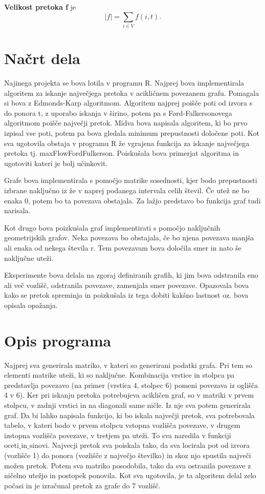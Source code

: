 \documentclass[a4paper]{article}
\begin{document}
\textbf{Velikost pretoka f} je $$|f|= \sum_{i \in V} f(i,t). $$


\section{Načrt dela}

Najinega projekta se bova lotila v programu R. Najprej bova implementirala algoritem za iskanje največjega pretoka v acikličnem povezanem grafu. Pomagala si  bova z Edmonds-Karp algoritmom. Algoritem najprej poišče poti od izvora s do ponora t, z uporabo iskanja v širino, potem pa s  Ford-Falkersonovega algoritmom poišče največji pretok. Midva bova napisala algoritem, ki bo prvo izpisal vse poti, potem pa bova gledala minimum prepustnosti določene poti. Kot sva ugotovila obstaja v programu R že vgrajena funkcija za iskanje največjega pretoka tj. maxFlowFordFulkerson. Poiskušala bova primerjat algoritma in ugotoviti kateri je bolj učinkovit. 

Grafe bova implementirala s pomočjo matrike sosednosti, kjer bodo prepustnosti izbrane naključno iz že v naprej podanega intervala celih števil. Če utež ne bo enaka 0, potem bo ta povezava obstajala. Za lažjo predstavo bo funkcija graf tudi narisala. 

Kot drugo bova poizkušala graf implementirati s pomočjo naključnih geometrijskih grafov. Neka povezava bo obstajala, če bo njena povezava manjša ali enaka od nekega števila r. Tem povezavam bova določila smer in nato še naključne uteži.

Eksperimente bova delala na zgoraj definiranih grafih, ki jim bova odstranila eno ali več vozlišč, odstranila povezave, zamenjala smer povezave. Opazovala bova kako se pretok spreminja in poizkušala iz tega dobiti kakšno lastnost oz. bova opisala opažanja. 

\section{Opis programa}

Najprej sva generirala matriko, v kateri so generirani podatki grafa. Pri tem so elementi matrike uteži, ki so naključne. Kombinacija vrstice in stolpca pa predstavlja povezavo (na primer (vrstica 4, stolpec 6) pomeni povezava iz oglišča 4 v 6). Ker pri iskanju pretoka potrebujeva acikličen graf, so v matriki v prvem stolpcu, v zadnji vrstici in na diagonali same ničle. Iz nje sva potem generirala graf. Da bi lahko napisala funkcijo, ki bo iskala največji pretok, sva potrebovala tabelo, v kateri bodo v prvem stolpcu vstopna vozlišča povezave, v drugem izstopna vozlišča povezave, v tretjem pa uteži. To sva naredila v funkciji $\text{oceti\_in\_sinovi}$. Najvecji pretok sva poiskala tako, da sva locirala pot od izvora (vozlišče 1) do ponora (vozlišče z največjo številko) in skoz njo spustila največi možen pretok. Potem sva matriko posodobila, tako da sva ostranila povezave z ničelno utežjo in postopek ponovila. Kot sva ugotovila, je ta algoritem delal zelo počasi in je izračunal pretok za grafe do 7 vozlišč. 
\end{document}
